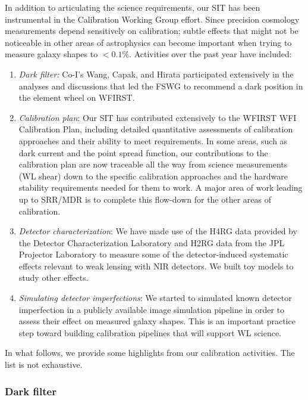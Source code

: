 \begin{summaryii}
  In addition to articulating the science requirements, our SIT has been
  instrumental in the Calibration Working Group effort. Since precision
  cosmology measurements depend sensitively on calibration; subtle effects that
  might not be noticeable in other areas of astrophysics can become important
  when trying to measure galaxy shapes to $<0.1$\%. Activities over the past
  year have included:
  \begin{enumerate}
  \item {\em Dark filter:} Co-I's Wang, Capak, and Hirata participated
  extensively in the analyses and discussions that led the FSWG to recommend a
  dark position in the element wheel on WFIRST.
 \item {\em Calibration plan}: Our SIT has contributed extensively to the WFIRST WFI
Calibration Plan, including detailed quantitative assessments of calibration
approaches and their ability to meet requirements. In some areas, such as dark
current and the point spread function, our contributions to the calibration plan
are now traceable all the way from science measurements (WL shear) down to the
specific calibration approaches and the hardware stability requirements needed
for them to work. A major area of work leading up to SRR/MDR is to complete this
flow-down for the other areas of calibration.
\item {\em Detector characterization}: We have made use of the H4RG data provided by the Detector Characterization Laboratory and
H2RG data from the JPL Projector Laboratory to measure some of the detector-induced systematic effects relevant to weak lensing with
NIR detectors. We built toy models to study other effects.
\item {\em Simulating detector imperfections}: We started to simulated known detector imperfection in a publicly available image simulation pipeline in order to assess their effect on measured galaxy shapes. This is an important practice step
toward building calibration pipelines that will support WL science.
\end{enumerate}
In what follows, we provide some highlights from our calibration activities. The
list is not exhaustive.
\end{summaryii}

\subsubsection{Dark filter}

